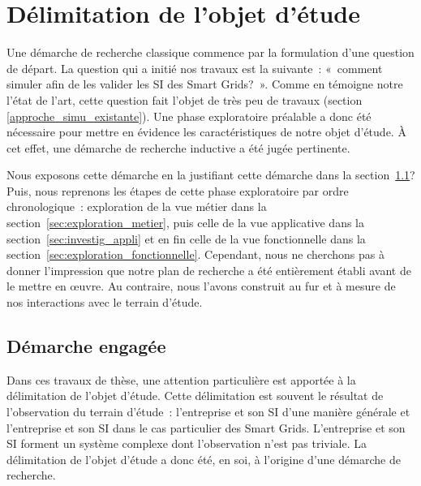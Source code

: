 \chapter{Délimitation de l'objet d'étude}
\label{ch:methodo}

\PartialToc


Une démarche de recherche classique commence par la formulation d'une question 
de départ. La question qui a initié nos travaux est la suivante~: «~comment 
simuler afin de les valider les SI des Smart Grids?~».  Comme en témoigne notre 
l'état de l'art, cette question fait l'objet de très peu de travaux (section 
\ref{approche_simu_existante}). Une phase exploratoire préalable a donc été nécessaire 
pour mettre en évidence les caractéristiques de notre objet d'étude. À cet effet,
une démarche de recherche inductive a été jugée pertinente.

Nous exposons cette démarche en la justifiant cette démarche dans la section~\ref{sec:demarche_objet_etude}?
Puis, nous reprenons les étapes de cette phase exploratoire 
par ordre chronologique~: exploration de la vue métier dans la section~\ref{sec:exploration_metier}, puis celle de la vue 
applicative dans la section~\ref{sec:investig_appli} et en fin celle de la vue fonctionnelle dans 
la section~\ref{sec:exploration_fonctionnelle}.
Cependant, nous ne cherchons pas à donner l'impression que notre plan de recherche a été 
entièrement établi avant de le mettre en œuvre. Au contraire, nous l'avons 
construit au fur et à mesure de nos interactions avec le terrain d'étude. 








\section{Démarche engagée}
\label{sec:demarche_objet_etude}
		
Dans ces travaux de thèse, une attention particulière est apportée à la délimitation de l'objet d'étude. 
Cette délimitation est souvent le résultat de l'observation du terrain d'étude~: 
l'entreprise et son SI d'une manière générale et l'entreprise et son SI dans le 
cas particulier des Smart Grids. L'entreprise et son SI forment un système 
complexe dont l'observation n'est pas triviale. La délimitation de l'objet 
d'étude a donc été, en soi, à l'origine d'une démarche de recherche.

